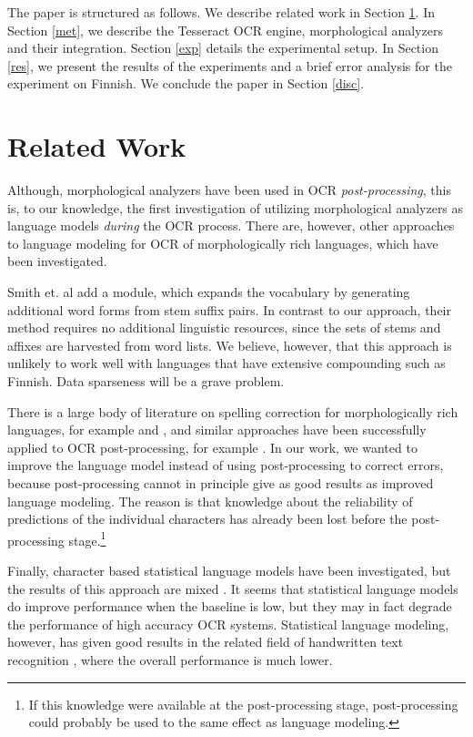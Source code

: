 \documentclass[b5paper]{article}
\begin{document}
The paper is structured as follows. We describe related work in
Section \ref{rel}. In Section \ref{met}, we describe the Tesseract OCR
engine, morphological analyzers and their integration. Section
\ref{exp} details the experimental setup. In Section \ref{res}, we
present the results of the experiments and a brief error analysis for
the experiment on Finnish. We conclude the paper in Section
\ref{disc}.

\section{Related Work}
\label{rel}
Although, morphological analyzers have been used in OCR {\it
  post-processing}, this is, to our knowledge, the first investigation
of utilizing morphological analyzers as language models {\it during}
the OCR process. There are, however, other approaches to language
modeling for OCR of morphologically rich languages, which have been
investigated.

Smith et. al \cite{smith09} add a module, which expands the vocabulary
by generating additional word forms from stem suffix pairs. In
contrast to our approach, their method requires no additional
linguistic resources, since the sets of stems and affixes are
harvested from word lists. We believe, however, that this approach is
unlikely to work well with languages that have extensive compounding
such as Finnish. Data sparseness will be a grave problem.

There is a large body of literature on spelling correction for
morphologically rich languages, for example \cite{oflazer94} and
\cite{pirinen12}, and similar approaches have been successfully
applied to OCR post-processing, for example
\cite{Takeuchi2000,Proszeky2014,Magdy2006}. In our work, we wanted to
improve the language model instead of using post-processing to correct
errors, because post-processing cannot in principle give as good
results as improved language modeling. The reason is that knowledge
about the reliability of predictions of the individual characters has
already been lost before the post-processing stage.\footnote{If this
  knowledge were available at the post-processing stage,
  post-processing could probably be used to the same effect as
  language modeling.}

Finally, character based statistical language models have been
investigated, but the results of this approach are mixed
\cite{smith11}. It seems that statistical language models do improve
performance when the baseline is low, but they may in fact degrade
the performance of high accuracy OCR systems. Statistical
language modeling, however, has given good results in the related field of
handwritten text recognition \cite{marti01}, where the overall
performance is much lower.
\end{document}
